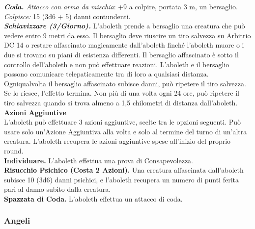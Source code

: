 \begin{multicols}{2}
\emph{\textbf{Coda.} Attacco con arma da mischia}: +9 a colpire, portata 3 m, un bersaglio.\\
\emph{Colpisce:} 15 (3d6 + 5) danni contundenti.\\
\emph{\textbf{Schiavizzare (3/Giorno).}} L'aboleth prende a bersaglio
una creatura che può vedere entro 9 metri da esso. Il bersaglio deve
riuscire un tiro salvezza su Arbitrio DC 14 o restare affascinato
magicamente dall'aboleth finché l'aboleth muore o i due si trovano su
piani di esistenza differenti. Il bersaglio affascinato è sotto il
controllo dell'aboleth e non può effettuare reazioni. L'aboleth e il
bersaglio possono comunicare telepaticamente tra di loro a qualsiasi
distanza.\\
Ogniqualvolta il bersaglio affascinato subisce danni, può ripetere il
tiro salvezza. Se lo riesce, l'effetto termina. Non più di una volta
ogni 24 ore, può ripetere il tiro salvezza quando si trova almeno a 1,5
chilometri di distanza dall'aboleth.\\
\textbf{Azioni Aggiuntive}\\
L'aboleth può effettuare 3 azioni aggiuntive, scelte tra le opzioni seguenti. Può usare solo un'Azione Aggiuntiva alla volta e solo al termine del turno di un'altra creatura. L'aboleth recupera le azioni aggiuntive spese all'inizio del proprio round.\\
\textbf{Individuare.} L'aboleth effettua una prova di Consapevolezza. \\
\textbf{Risucchio Psichico (Costa 2 Azioni).} Una creatura affascinata dall'aboleth subisce 10 (3d6) danni psichici, e l'aboleth recupera un numero di punti ferita pari al danno subito dalla creatura.\\
\textbf{Spazzata di Coda.} L'aboleth effettua un attacco di coda.

\subsubsection{Angeli}


\end{multicols}
